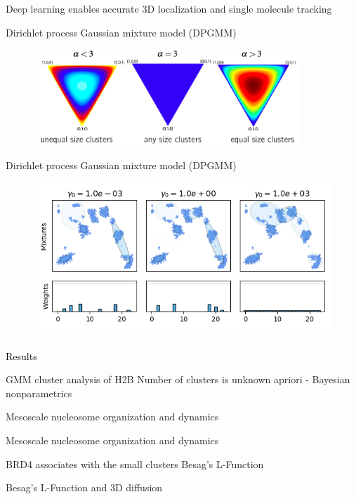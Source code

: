 \documentclass{beamer}					%
\begin{document}
\begin{frame}{Deep learning enables accurate 3D localization and single molecule tracking}

\end{frame}


\begin{frame}{Dirichlet process Gaussian mixture model (DPGMM)}
\begin{figure}
\includegraphics[width=10cm]{Dirichlet.png}
\end{figure}
\end{frame}

\begin{frame}{Dirichlet process Gaussian mixture model (DPGMM)}
\begin{figure}
\includegraphics[width=13cm]{GMM.png}
\end{figure}
\end{frame}

\begin{frame}
\frametitle{}
\centering
\Large \textcolor{black}{Results}
\end{frame}


\begin{frame}{GMM cluster analysis of H2B}
Number of clusters is unknown apriori - Bayesian nonparametrics
\end{frame}

\begin{frame}{Mesoscale nucleosome organization and dynamics}
\end{frame}

\begin{frame}{Mesoscale nucleosome organization and dynamics}
\end{frame}

\begin{frame}{BRD4 associates with the small clusters}
Besag's L-Function
\end{frame}

\begin{frame}{Besag's L-Function and 3D diffusion}
\end{frame}
\end{document}
